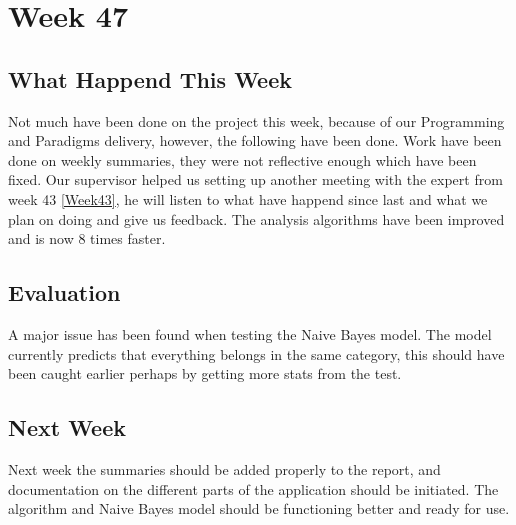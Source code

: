 \section*{Week 47}
\subsection*{What Happend This Week}
Not much have been done on the project this week, because of our Programming
and Paradigms delivery, however, the following have been done.
Work have been done on weekly summaries, they were not reflective enough which
have been fixed.
Our supervisor helped us setting up another meeting with the expert from week 43
\ref{Week43}, he will listen to what have happend since last and what we plan on
doing and give us feedback. The analysis algorithms have been improved and is
now 8 times faster.

\subsection*{Evaluation}
A major issue has been found when testing the Naive Bayes model. The model
currently predicts that everything belongs in the same category, this should
have been caught earlier perhaps by getting more stats from the test. 

\subsection*{Next Week}
Next week the summaries should be added properly to the report, and
documentation on the different parts of the application should be initiated. The
algorithm and Naive Bayes model should be functioning better and ready for use.


% 
% 
% 
